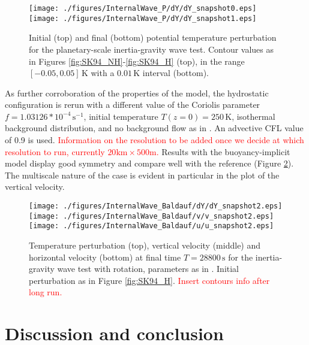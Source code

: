\documentclass{ametsoc}
\theoremstyle{definition}
\newcommand{\benacchio}[1]{\textcolor{red}{#1}}
\begin{document}
\begin{figure}
\centering
 \texttt{[image: ./figures/InternalWave\_P/dY/dY\_snapshot0.eps]}
 \texttt{[image: ./figures/InternalWave\_P/dY/dY\_snapshot1.eps]}
 \caption{Initial (top) and final (bottom) potential temperature perturbation for the planetary-scale inertia-gravity wave test. Contour values as in Figures \ref{fig:SK94_NH}-\ref{fig:SK94_H} (top), in the range $[-0.05, 0.05]\,\textrm{K}$ with a $0.01\,\textrm{K}$ interval (bottom).}
  \label{fig:SK94_P}
\end{figure}

As further corroboration of the properties of the model, the hydrostatic configuration is rerun with a different value of the Coriolis parameter $f=1.03126*10^{-4}\,\textrm{s}^{-1}$, initial temperature $T(z=0)=250\,\textrm{K}$, isothermal background distribution, and no background flow as in \cite{BaldaufBrdar2013}. An advective CFL value of 0.9 is used. \benacchio{Information on the resolution to be added once we decide at which resolution to run, currently $20\textrm{km}\times500\textrm{m}$.} Results with the buoyancy-implicit model display good symmetry and compare well with the reference (Figure \ref{fig:BB13}). The multiscale nature of the case is evident in particular in the plot of the vertical velocity.

\begin{figure}
\centering
 \texttt{[image: ./figures/InternalWave\_Baldauf/dY/dY\_snapshot2.eps]}
 \texttt{[image: ./figures/InternalWave\_Baldauf/v/v\_snapshot2.eps]}
 \texttt{[image: ./figures/InternalWave\_Baldauf/u/u\_snapshot2.eps]}
 \caption{Temperature perturbation (top), vertical velocity (middle) and horizontal velocity (bottom) at final time $T=28800\,\textrm{s}$ for the inertia-gravity wave test with rotation, parameters as in \cite{BaldaufBrdar2013}. Initial perturbation as in Figure \ref{fig:SK94_H}. \benacchio{Insert contours info after long run.}}
  \label{fig:BB13}
\end{figure}


\section{Discussion and conclusion}
\label{sec:Conclusions}	
\end{document}
